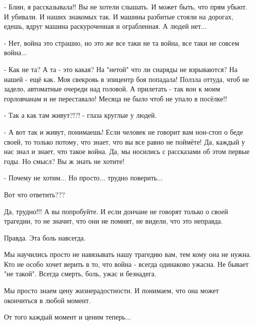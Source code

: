 - Блин, я рассказывала!! Вы не хотели слышать. И может быть, что прям убьют. И
убивали. И наших знакомых так. И машины разбитые стояли на дорогах, едешь,
вдруг машина раскуроченная и ограбленная. А людей нет... 

- Нет, война это страшно, но это же все таки не та война, все таки не совсем война... 

- Как не та? А та - это какая? На "нетой" что ли снаряды не взрываются? На
нашей - ещё как. Моя свекровь в эпицентр боя попадала! Ползла оттуда, чтоб не
задело, автоматные очереди над головой. А прилетать - так вон к моим
горловчанам и не переставало! Месяца не было чтоб не упало в посёлке!! 

- Так а как там живут?!?! - глаза круглые у людей. 

- А вот так и живут, понимаешь! Если человек не говорит вам нон-стоп о беде
своей, то только потому, что знает, что вы все равно не поймёте! Да, каждый у
нас знал и знает, что такое война. Да, мы носились с рассказами об этом первые
годы. Но смысл? Вы ж знать не хотите! 

- Почему не хотим... Но просто... трудно поверить... 

  Вот что ответить??? 

Да,  трудно!!! А вы попробуйте. И если дончане не говорят только о своей
трагедии, то не значит, что они не помнят, не видели, что это неправда. 

Правда. Эта боль навсегда. 

Мы научились просто не навязывать нашу трагедию вам, тем кому она не нужна.
Кто не особо хочет верить в то, что война - всегда одинаково ужасна. Не бывает
"не такой". Всегда смерть, боль, ужас и безнадега. 

Мы просто знаем цену жизнерадостности. И понимаем, что она может окончиться в
любой момент. 

От того каждый момент и ценим теперь...

